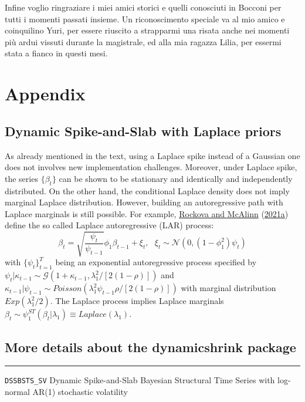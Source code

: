 \documentclass[
  12pt,
]{book}
\theoremstyle{break}
\theoremstyle{nonumberplain}
\begin{document}
Infine voglio ringraziare i miei amici storici e quelli conosciuti in
Bocconi per tutti i momenti passati insieme. Un riconoscimento speciale
va al mio amico e coinquilino Yuri, per essere riuscito a strapparmi una
risata anche nei momenti più ardui vissuti durante la magistrale, ed
alla mia ragazza Lilia, per essermi stata a fianco in questi mesi.

\appendix

\chapter{Appendix}

\section{Dynamic Spike-and-Slab with Laplace priors}\label{Appendix A.1}

As already mentioned in the text, using a Laplace spike instead of a
Gaussian one does not involves new implementation challenges. Moreover,
under Laplace spike, the series \(\{\beta_{t}\}\) can be shown to be
stationary and identically and independently distributed. On the other
hand, the conditional Laplace density does not imply marginal Laplace
distribution. However, building an autoregressive path with Laplace
marginals is still possible. For example,
\protect\hyperlink{ref-rockova_mcalinn_2021}{Rockova and McAlinn}
(\protect\hyperlink{ref-rockova_mcalinn_2021}{2021a}) define the so
called Laplace autoregressive (LAR) process:
\[ \beta_{t}=\sqrt{\frac{\psi_{t}}{\psi_{t-1}}}\phi_{1}\beta_{t-1}+\xi_{t}, \ \ \ \xi_{t}\sim\mathcal{N}(0,(1-\phi_{1}^{2})\psi_{t})
\] with \(\{\psi_{t}\}_{t=1}^{T}\) being an exponential autoregressive
process specified by
\(\psi_{t}|\kappa_{t-1}\sim\mathcal{G}(1+\kappa_{t-1},\lambda_{1}^{2}/[2(1-\rho)])\)
and
\(\kappa_{t-1}|\psi_{t-1}\sim Poisson (\lambda_{1}^{2}\psi_{t-1}\rho/[2(1-\rho)])\)
with marginal distribution \(Exp(\lambda_{1}^{2}/2)\). The Laplace
process implies Laplace marginals
\(\beta_{t}\sim \psi^{ST}_{1}(\beta_{t}|\lambda_{1})\equiv Laplace(\lambda_{1})\).\\

\section{More details about the dynamicshrink package}

\hrule
\vspace{1em}

\texttt{DSSBSTS\_SV} Dynamic Spike-and-Slab Bayesian Structural Time
Series with log-normal AR(1) stochastic volatility \vspace{1em}
\end{document}
